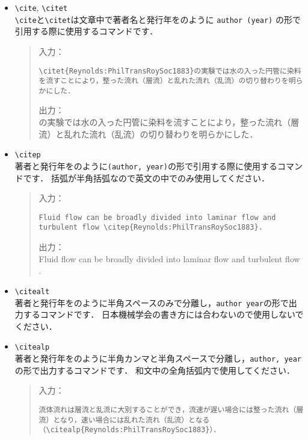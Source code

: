 \documentclass[a4paper,fleqn,uplatex,dvipdfmx]{jsarticle}
\begin{document}
\begin{itemize}
    \item \verb|\cite|, \verb|\citet| \\
    \verb|\cite|と\verb|\citet|は文章中で著者名と発行年を\citet{Reynolds:PhilTransRoySoc1883}のように \verb|author (year)| の形で引用する際に使用するコマンドです．
\begin{quote}
入力：
\begin{verbatim}
\citet{Reynolds:PhilTransRoySoc1883}の実験では水の入った円管に染料を流すことにより，整った流れ（層流）と乱れた流れ（乱流）の切り替わりを明らかにした．
\end{verbatim}
出力：\\
    \citet{Reynolds:PhilTransRoySoc1883}の実験では水の入った円管に染料を流すことにより，整った流れ（層流）と乱れた流れ（乱流）の切り替わりを明らかにした．
\end{quote}
    \item \verb|\citep| \\
    著者と発行年を\citep{Reynolds:PhilTransRoySoc1883}のように\verb|(author, year)|の形で引用する際に使用するコマンドです．
    括弧が半角括弧なので英文の中でのみ使用してください．
\begin{quote}
入力：
\begin{verbatim}
Fluid flow can be broadly divided into laminar flow and 
turbulent flow \citep{Reynolds:PhilTransRoySoc1883}.
\end{verbatim}
出力：\\
    Fluid flow can be broadly divided into laminar flow and turbulent flow \citep{Reynolds:PhilTransRoySoc1883}.
\end{quote}
    \item \verb|\citealt| \\
    著者と発行年を\citealt{Reynolds:PhilTransRoySoc1883}のように半角スペースのみで分離し，\verb|author year|の形で出力するコマンドです．
    日本機械学会の書き方には合わないので使用しないでください．
    \item \verb|\citealp| \\
    著者と発行年を\citealp{Reynolds:PhilTransRoySoc1883}のように半角カンマと半角スペースで分離し，\verb|author, year|の形で出力するコマンドです．
    和文中の全角括弧内で使用してください．
\begin{quote}
入力：
\begin{verbatim}
流体流れは層流と乱流に大別することができ，流速が遅い場合には整った流れ（層流）となり，速い場合には乱れた流れ（乱流）となる（\citealp{Reynolds:PhilTransRoySoc1883}）．
\end{verbatim}

\end{quote}
\end{itemize}
\end{document}
